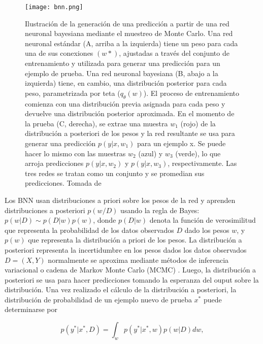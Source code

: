 \documentclass[10pt, oneside, a4paper]{article}
\begin{document}
	
	\begin{figure}[H]
	\texttt{[image: bnn.png]}
	\caption{{\small Ilustración de la generación de una predicción a partir de una red neuronal bayesiana mediante el muestreo de Monte Carlo.
	Una red neuronal estándar (A, arriba a la izquierda) tiene un peso para cada una de sus conexiones $(w*)$, ajustadas a través del conjunto de entrenamiento y utilizada para generar una predicción para un ejemplo de prueba. Una red neuronal bayesiana (B, abajo a la izquierda) tiene, en cambio, una distribución posterior para cada peso, parametrizada por teta ($q_{\theta}(w)$). El proceso de entrenamiento comienza con una distribución previa asignada para cada peso y devuelve una distribución posterior aproximada. En el momento de la prueba (C, derecha), se extrae una muestra $w_{1}$ (rojo) de la distribución a posteriori de los pesos y la red resultante se usa para generar una predicción $p(y|x,w_{1})$ para un ejemplo x. Se puede hacer lo mismo con las muestras $w_{2}$ (azul) y $w_{3}$ (verde), lo que arroja predicciones $p(y|x,w_{2})$ y $p(y|x,w_{3})$, respectivamente. Las tres redes se tratan como un conjunto y se promedian sus predicciones. Tomada de \href{https://www.researchgate.net/publication/336608788_Knowing_What_You_Know_in_Brain_Segmentation_Using_Bayesian_Deep_Neural_Networks}{\cite{brain_segmentation}}}}
	\label{fig:bnn_1}
	\end{figure}
	
	Los BNN usan distribuciones a priori sobre los pesos de la red y aprenden distribuciones a posteriori $p(w/D)$ usando la regla de Bayes: $ p(w|D) \sim p(D|w)p(w)$, donde $p(D|w)$ denota la función de verosimilitud que representa la probabilidad de los datos observados $D$ dado los pesos $w$, y $p(w)$ que representa la distribución a priori de los pesos. La distribución a posteriori representa la incertidumbre en los pesos dados los datos observados $D = (X, Y)$ normalmente se aproxima mediante métodos de inferencia variacional \cite{chai2018uncertainty, heek2018well} o cadena de Markov Monte Carlo (MCMC) \cite{neal2012bayesian}. Luego, la distribución a posteriori se usa para hacer predicciones tomando la esperanza del ouput sobre la distribución. Una vez realizado el cálculo de la distribución a posteriori, la distribución de probabilidad de un ejemplo nuevo de prueba $x^{*}$ puede determinarse por

	\begin{equation} \label{eq:posterior_test_example}
	p(y^{*} | x^{*}, D) = \int_{w}^{} p(y^{*} | x^{*}, w) p(w|D) dw,
	\end{equation}	
	
\end{document}
